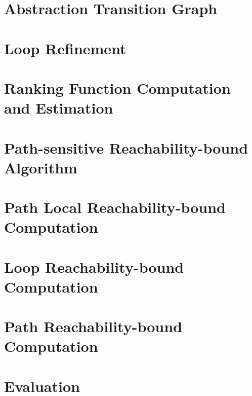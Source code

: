 \documentclass[runningheads]{llncs}
\begin{document}
\section{Abstraction Transition Graph}
\label{sec:progabs}

\section{Loop Refinement}
\label{sec:refine}

\section{Ranking Function Computation and Estimation}
\label{sec:rank}

\section{Path-sensitive Reachability-bound Algorithm}
\label{sec:psrb}

\section{Path Local Reachability-bound Computation}
\label{sec:pathlocalrb}


\section{Loop Reachability-bound Computation}
\label{sec:looprb}

% 
\section{Path Reachability-bound Computation}
\label{sec:pathrb}


% 

\section{Evaluation}
\label{sec:eval}

% 
%
\end{document}

